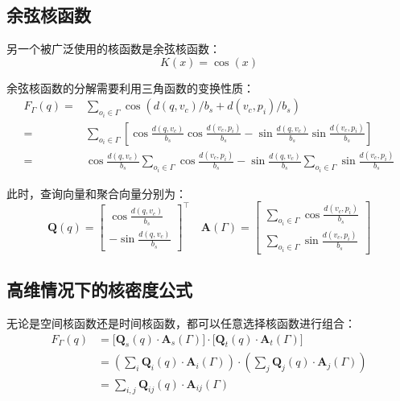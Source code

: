 \subsection{余弦核函数}

另一个被广泛使用的核函数是余弦核函数：
\begin{equation*}
	K(x) = \cos(x)
\end{equation*}

余弦核函数的分解需要利用三角函数的变换性质：
\begin{equation*}
	\begin{aligned}
		F_\Gamma(q)
		=& \sum_{o_i \in \Gamma} \cos\left(d(q, v_c)/b_s + d(v_c, p_i)/b_s\right) \\
		=& \sum_{o_i \in \Gamma} \left[\cos \frac{d(q, v_c)}{b_s} \cos \frac{d(v_c, p_i)}{b_s} - \sin \frac{d(q, v_c)}{b_s} \sin \frac{d(v_c, p_i)}{b_s}\right] \\
		=& \cos \frac{d(q, v_c)}{b_s} \sum_{o_i \in \Gamma} \cos \frac{d(v_c, p_i)}{b_s} 
		-  \sin \frac{d(q, v_c)}{b_s} \sum_{o_i \in \Gamma} \sin \frac{d(v_c, p_i)}{b_s}
	\end{aligned}
\end{equation*}

此时，查询向量和聚合向量分别为：
\begin{equation*}
	\mathbf{Q}(q) = 
	\begin{bmatrix}
		\cos \frac{d(q, v_c)}{b_s} \\
		-\sin \frac{d(q, v_c)}{b_s}
	\end{bmatrix}^\top
	\quad
	\mathbf{A}(\Gamma) = 
	\begin{bmatrix}
		\sum_{o_i \in \Gamma} \cos \frac{d(v_c, p_i)}{b_s} \\
		\sum_{o_i \in \Gamma} \sin \frac{d(v_c, p_i)}{b_s}
	\end{bmatrix}
\end{equation*}

\subsection{高维情况下的核密度公式}

无论是空间核函数还是时间核函数，都可以任意选择核函数进行组合：
\begin{equation*}
\begin{aligned}
	F_\Gamma(q) &= \Big[\mathbf{Q}_s(q) \cdot \mathbf{A}_s(\Gamma)\Big] \cdot \Big[\mathbf{Q}_t(q) \cdot \mathbf{A}_t(\Gamma)\Big] \\
	&=\left(\sum_i \mathbf{Q}_i(q) \cdot \mathbf{A}_i(\Gamma)\right) \cdot \left(\sum_j \mathbf{Q}_j(q) \cdot \mathbf{A}_j(\Gamma)\right) \\
	&=\sum_{i,j} \mathbf{Q}_{ij}(q) \cdot \mathbf{A}_{ij}(\Gamma)
\end{aligned}
\end{equation*}

